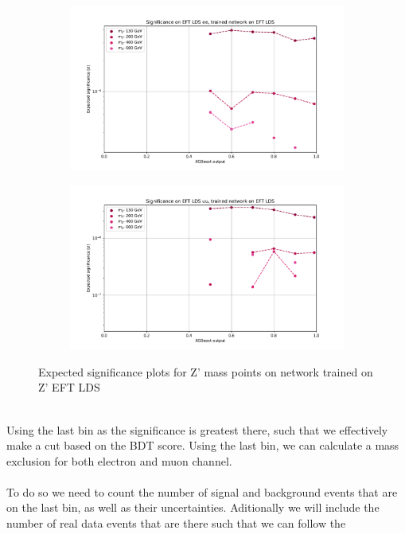 \documentclass[14pt, a4paper]{book}
\begin{document}
\begin{figure}[!ht]
	\centering
	\begin{subfigure}[b]{0.49\textwidth}
      \centering
      \includegraphics[width=1\textwidth]{XGBoost/EFT_LDS/EXP_SIG_ee.pdf}
      \end{subfigure}
   \hfill
   \begin{subfigure}[b]{0.49\textwidth}
      \centering
      \includegraphics[width=1\textwidth]{XGBoost/EFT_LDS/EXP_SIG_uu.pdf}
      \end{subfigure}
   \caption{Expected significance plots for Z' mass points on network trained on Z' EFT LDS}\label{fig:EFT_LDS_exp_sig}
\end{figure}
\\Using the last bin as the significance is greatest there, such that we effectively make a cut based on the BDT score. Using the last bin, we can calculate a mass exclusion for both electron and muon channel.\\
\\To do so we need to count the number of signal and background events that are on the last bin, as well as their uncertainties. Aditionally we will include the number of real data events that are there such that we can follow the 
\end{document}
